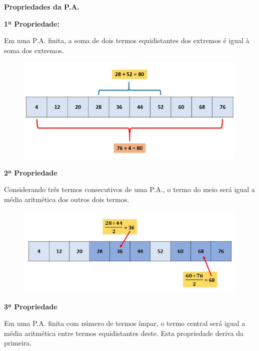 \begin{multicols*}{2}
	\textbf{Propriedades da P.A.}

	\textbf{1ª Propriedade:}

	Em uma P.A. finita, a soma de dois termos equidistantes dos extremos é igual à soma dos extremos.

	\begin{figure}
		\centering
		\includegraphics[width=\columnwidth]{assets/papropriedade1.jpg}
	\end{figure}

	\textbf{2ª Propriedade}

	Considerando três termos consecutivos de uma P.A., o termo do meio será igual a média aritmética dos outros dois termos.

	\begin{figure}[H]
		\centering
		\includegraphics[width=\columnwidth]{assets/papropriedade2.jpg}
	\end{figure}

	\textbf{3ª Propriedade}

	Em uma P.A. finita com número de termos ímpar, o termo central será igual a média aritmética entre termos equidistantes deste. Esta propriedade deriva da primeira.


\end{multicols*}
